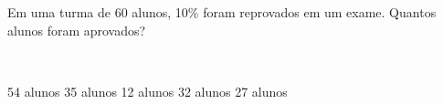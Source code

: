 \parbox{\linewidth}{

Em uma turma de 60 alunos, 10\% foram reprovados em um exame. Quantos alunos foram aprovados?}
\vspace{2mm}
\\\parbox{\linewidth}{

54 alunos
35 alunos
12 alunos
32 alunos
27 alunos

}

